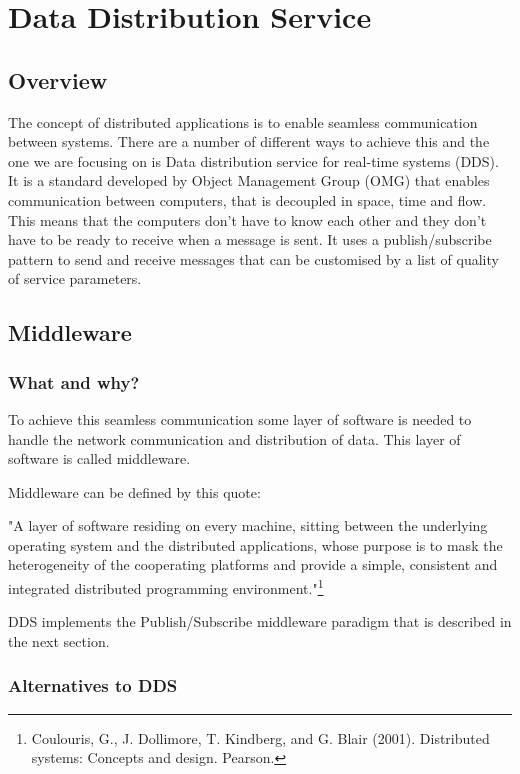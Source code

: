 \chapter{Data Distribution Service}
\section{Overview}
The concept of distributed applications is to enable seamless communication between systems. There are a number of different ways to achieve this and the one we are focusing on is Data distribution service for real-time systems (DDS).
It is a standard developed by Object Management Group (OMG) that enables communication between computers, that is decoupled in space, time and flow. This means that the computers don't have to know each other and they don't have to be ready to receive when a message is sent. It uses a publish/subscribe pattern to send and receive messages that can be customised by a list of quality of service parameters.

\section{Middleware}

\subsection{What and why?}
To achieve this seamless communication some layer of software is needed to handle the network communication and distribution of data. This layer of software is called middleware.

Middleware can be defined by this quote:

"A layer of software residing on every machine, sitting between the
underlying operating system and the distributed applications,
whose purpose is to mask the heterogeneity of the cooperating
platforms and provide a simple, consistent and integrated
distributed programming environment."\footnote{Coulouris, G., J. Dollimore, T. Kindberg, and G. Blair (2001). Distributed systems: Concepts and design. Pearson.}

DDS implements the Publish/Subscribe middleware paradigm that is described in the next section.

\subsection{Alternatives to DDS}




